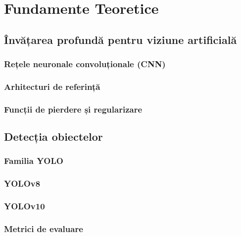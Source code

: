 \documentclass[../../main.tex]{subfiles}
\begin{document}
\chapter{Fundamente Teoretice}
\label{ch:fundamente}

\section{Învățarea profundă pentru viziune artificială}
\label{sec:deep_learning}

\subsection{Rețele neuronale convoluționale (CNN)}
\label{subsec:cnn}

\subsection{Arhitecturi de referință}
\label{subsec:arhitecturi_referinta}

\subsection{Funcții de pierdere și regularizare}
\label{subsec:functii_pierdere}

\section{Detecția obiectelor}
\label{sec:detectie_obiecte}

\subsection{Familia YOLO}
\label{subsec:yolo}

\subsection{YOLOv8}
\label{subsec:yolov8}

\subsection{YOLOv10}
\label{subsec:yolov10}

\subsection{Metrici de evaluare}
\label{subsec:metrici_detectie}
\end{document}
